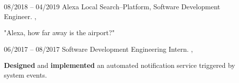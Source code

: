 \begin{entrylist}
{    		 
    		 }
	\entry
		{08/2018 -- 04/2019}
    		{Alexa Local Search--Platform, Software Development Engineer.}
    		{\alexaauto, \atoz}
    		{"Alexa, how far away is the airport?"
    		
    		}
    	\entry
		{06/2017 -- 08/2017}
    		{Software Development Engineering Intern.}
    		{\avs, \atoz}
    		{\textbf{Designed} and \textbf{implemented} an automated notification service triggered by system events.
    		
    		}
\end{entrylist}